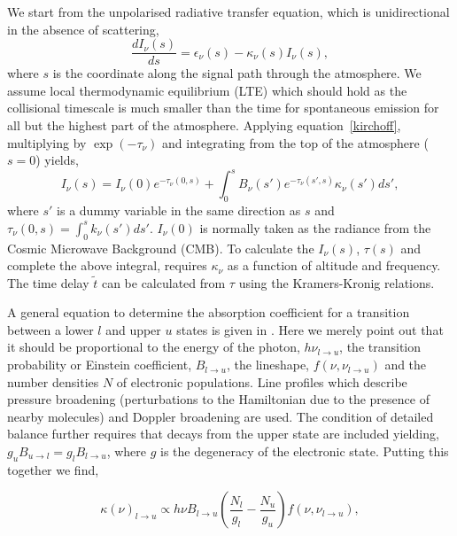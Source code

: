We start from the unpolarised radiative transfer equation, which is unidirectional in the absence of scattering,
\begin{equation}\label{eq:rad_trans}
\frac{dI_\nu (s) }{ds} = \epsilon_\nu(s) -\kappa_\nu(s)  I_\nu (s),
\end{equation}
where $s$ is the coordinate along the signal path through the atmosphere. We assume local thermodynamic equilibrium (LTE) which should hold as the collisional timescale is much smaller than the time for spontaneous emission for all but the highest part of the atmosphere. Applying equation~\ref{kirchoff}, multiplying by $\exp(-\tau_\nu)$ and integrating from the top of the atmosphere ($s=0$) yields, 
\begin{equation}\label{eq:rad_trans2}
I_\nu(s) = I_\nu(0) e^{-\tau_\nu (0,s) }+ \int_0^s B_\nu(s')e^{-\tau_\nu (s',s) }\kappa_\nu(s')ds',
\end{equation}
where  $s'$ is a dummy variable in the same direction as $s$ and $\tau_\nu (0,s) = \int_0^{s} k_\nu(s')ds'$. $I_\nu(0)$ is normally taken as the radiance from the Cosmic Microwave Background (CMB).
To calculate the $I_\nu(s)$, $\tau(s)$ and complete the above integral, requires $\kappa_\nu$ as a function of altitude and frequency. The time delay $\tilde{t}$ can be calculated from $\tau$ using the Kramers-Kronig relations. 


A general equation to determine the absorption coefficient for a transition between a lower $l$ and upper $u$ states is given in \citet{Pardo_2001}. Here we merely point out that it should be proportional to the energy of the photon, $h\nu_{l \to u}$, the transition probability or Einstein coefficient, $ B_{l \to u}$, the lineshape, $f(\nu,\nu_{l \to u})$ and the number densities $N$ of electronic populations. Line profiles which describe pressure broadening (perturbations to the Hamiltonian due to the presence of nearby molecules) and Doppler broadening are used. The condition of detailed balance further requires that decays from the upper state are included yielding, $g_u B_{u \to l} =g_l B_{l \to u}$, where $g$ is the degeneracy of the electronic state. Putting this together we find,

\begin{equation}
\kappa(\nu) _{l \to u}  \propto  h\nu   B_{l \to u}  \left(\frac{N_l}{g_l}  -  \frac{N_u}{g_u} \right) f(\nu,\nu_{l \to u}),
\end{equation}

